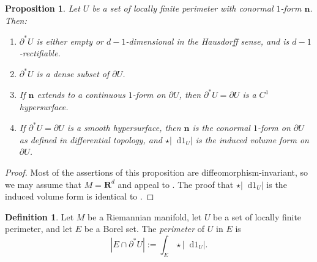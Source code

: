 \documentclass[reqno,12pt,letterpaper]{amsart}
\newcommand{\RR}{\mathbf{R}}
\newcommand*\dif{\mathop{}\!\mathrm{d}}
\newcommand{\normal}{\mathbf n}
\newcommand{\dfn}[1]{\emph{#1}\index{#1}}
\newtheorem{proposition}[theorem]{Proposition}
\theoremstyle{definition}
\newtheorem{definition}[theorem]{Definition}
\numberwithin{equation}{section}
\begin{document}
\begin{proposition}\label{locality of Caccioppoli}
    Let $U$ be a set of locally finite perimeter with conormal $1$-form $\normal$.
    Then:
    \begin{enumerate}
    \item $\partial^* U$ is either empty or $d-1$-dimensional in the Hausdorff sense, and is $d-1$-rectifiable.
    \item $\partial^* U$ is a dense subset of $\partial U$.
    \item If $\normal$ extends to a continuous $1$-form on $\partial U$, then $\partial^* U = \partial U$ is a $C^1$ hypersurface.
    \item If $\partial^* U = \partial U$ is a smooth hypersurface, then $\normal$ is the conormal $1$-form on $\partial U$ as defined in differential topology, and $\star |\dif 1_U|$ is the induced volume form on $\partial U$.
\end{enumerate}
\end{proposition}
\begin{proof}
Most of the assertions of this proposition are diffeomorphism-invariant, so we may assume that $M = \RR^d$ and appeal to \cite[Chapters 2-4]{Giusti77}.
The proof that $\star |\dif 1_U|$ is the induced volume form is identical to \cite[Example 1.4]{Giusti77}.
\end{proof}

\begin{definition}
Let $M$ be a Riemannian manifold, let $U$ be a set of locally finite perimeter, and let $E$ be a Borel set.
The \dfn{perimeter} of $U$ in $E$ is
$$|E \cap \partial^* U| := \int_E \star |\dif 1_U|.$$
\end{definition}
\end{document}
